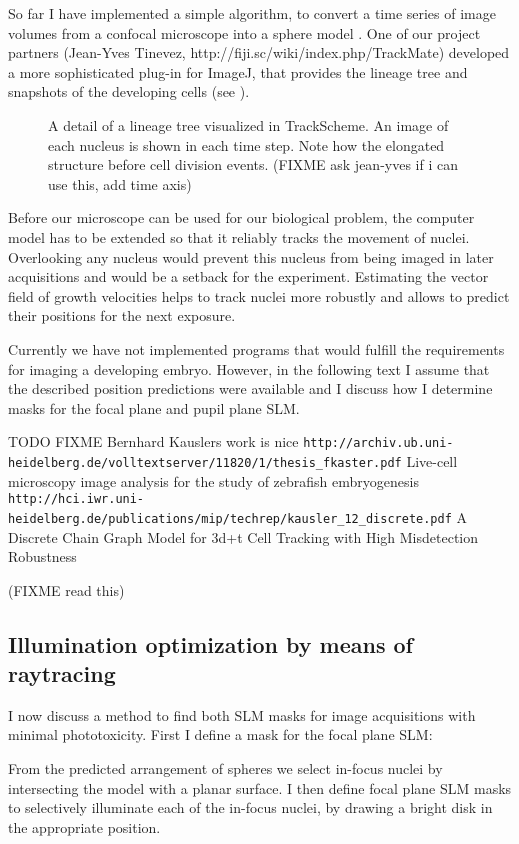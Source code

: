 So far I have implemented a simple algorithm, to convert a time series
of image volumes from a confocal microscope into a sphere model
\citep{Santella2010}.  One of our project partners (Jean-Yves Tinevez,
http://fiji.sc/wiki/index.php/TrackMate) developed a more
sophisticated plug-in for ImageJ, that provides the lineage tree and
snapshots of the developing cells (see ).
\begin{figure}[!hbt] \centering
{}
  \caption{ A detail of a lineage tree visualized in TrackScheme. An
image of each nucleus is shown in each time step. Note how the
elongated structure before cell division events. (FIXME ask jean-yves
if i can use this, add time axis)}
  \label{fig:trackmate}
\end{figure} Before our microscope can be used for our biological
problem, the computer model has to be extended so that it reliably
tracks the movement of nuclei.  Overlooking any nucleus would prevent
this nucleus from being imaged in later acquisitions and would be a
setback for the experiment.  Estimating the vector field of growth
velocities helps to track nuclei more robustly and allows to predict
their positions for the next exposure.

Currently we have not implemented programs that would fulfill the
requirements for imaging a developing embryo.  However, in the
following text I assume that the described position predictions were
available and I discuss how I determine masks for the focal plane and
pupil plane SLM.

\cite{Murray2006}

TODO FIXME Bernhard Kauslers work is nice
\verb!http://archiv.ub.uni-heidelberg.de/volltextserver/11820/1/thesis_fkaster.pdf!
Live-cell microscopy image analysis for the study of zebrafish embryogenesis
\verb!http://hci.iwr.uni-heidelberg.de/publications/mip/techrep/kausler_12_discrete.pdf!
A Discrete Chain Graph Model for
  3d+t Cell Tracking with High
    Misdetection Robustness

(FIXME read this)


\subsection{Illumination optimization by means of raytracing} 
I now discuss a method to find both SLM masks for image acquisitions
with minimal phototoxicity. First I define a mask for the focal plane
SLM:

From the predicted arrangement of spheres we select in-focus nuclei by
intersecting the model with a planar surface. I then define focal
plane SLM masks to selectively illuminate each of the in-focus nuclei,
by drawing a bright disk in the appropriate position.

